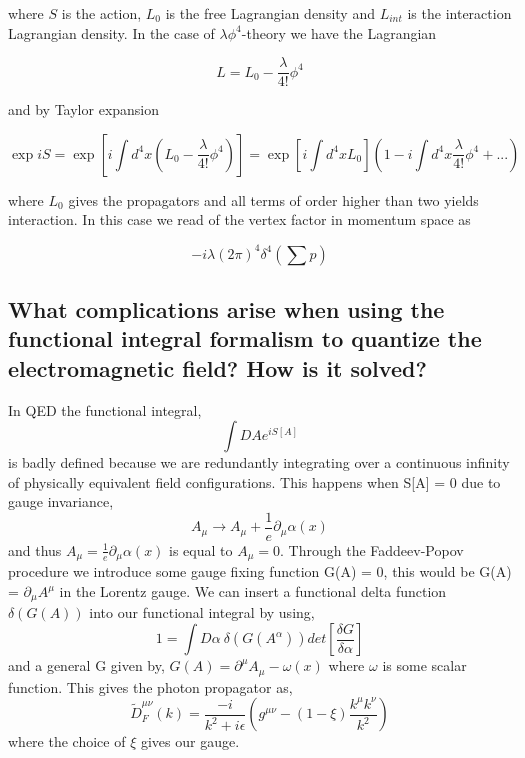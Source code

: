 \documentclass[paper=a4, fontsize=11pt]{scrartcl} %
\numberwithin{equation}{section} %
\numberwithin{figure}{section} %
\numberwithin{table}{section} %
\newcommand{\parentheses}[1]{\ensuremath{\left( #1 \right)}}
\newcommand{\commutator}[1]{\ensuremath{\left[ #1 \right]}}
\begin{document}
where $S$ is the action, $L_0$ is the free Lagrangian density and $L_{int}$ is the interaction Lagrangian density. In the case of $\lambda \phi^4$-theory we have the Lagrangian

\begin{equation}
L=L_0-\dfrac{\lambda}{4!}\phi^4
\end{equation}

and by Taylor expansion

\begin{equation}
\exp iS = \exp \commutator{i \int d^4 x \parentheses{L_0 - \dfrac{\lambda}{4!}\phi^4}}= \exp \commutator{i \int d^4 x L_0} \parentheses{1-i\int d^4x \dfrac{\lambda}{4!}\phi^4+...}
\end{equation}

where $L_0$ gives the propagators and all terms of order higher than two yields interaction. In this case we read of the vertex factor in momentum space as

\begin{equation}
-i\lambda (2 \pi)^4 \delta ^{4} \parentheses{\sum p}
\end{equation}

\subsection{What complications arise when using the functional integral formalism to
quantize the electromagnetic field? How is it solved?}
In QED the functional integral,
\begin{equation}
\int DA e^{iS[A]}
\end{equation}
is badly defined because we are redundantly integrating over a continuous infinity of physically equivalent field configurations. This happens when S[A] = 0 due to gauge invariance, 
\begin{equation}
A_{\mu} \rightarrow A_{\mu} + \frac{1}{e} \partial_{\mu} \alpha (x)
\end{equation}
and thus $ A_{\mu} = \frac{1}{e} \partial_{\mu} \alpha (x)$ is equal to $A_{\mu} = 0$. Through the Faddeev-Popov procedure we introduce some gauge fixing function G(A) = 0, this would be G(A) = $\partial_{\mu} A^{\mu}$ in the Lorentz gauge. We can insert a functional delta function $\delta (G(A))$ into our functional integral by using,
\begin{equation}
1 = \int D\alpha ~ \delta(G(A^{\alpha}))det\left[ \frac{\delta G}{\delta \alpha}\right]
\end{equation}
and a general G given by, $G(A) = \partial^{\mu} A_{\mu} - \omega (x)$ where $\omega$ is some scalar function. This gives the photon propagator as,
\begin{equation}
\tilde{D}^{\mu \nu}_F (k) = \frac{-i}{k^2+i\epsilon} \left( g^{ \mu \nu} - (1-\xi) \frac{k^{\mu}k^{\nu}}{k^2}\right)
\end{equation}
where the choice of $\xi$ gives our gauge.
\end{document}
